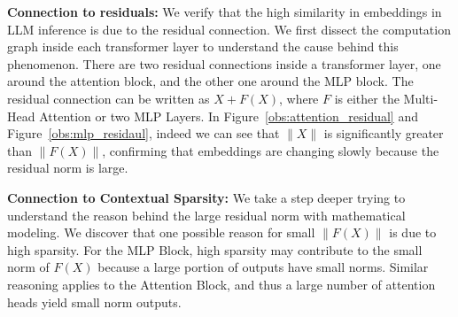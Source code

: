 \textbf{Connection to residuals:} We verify that the high similarity in embeddings in LLM inference is due to the residual connection. We first dissect the computation graph inside each transformer layer to understand the cause behind this phenomenon. There are two residual connections inside a transformer layer, one around the attention block, and the other one around the MLP block. The residual connection can be written as $X + F(X)$, where $F$ is either the Multi-Head Attention or two MLP Layers.  In Figure~\ref{obs:attention_residual} and Figure~\ref{obs:mlp_residaul},  indeed we can see that $\|X\|$ is significantly greater than $\|F(X)\|$, confirming that embeddings are changing slowly because the residual norm is large.   

\textbf{Connection to Contextual Sparsity:} We take a step deeper trying to understand the reason behind the large residual norm with mathematical modeling.  
We discover that one possible reason for small $\|F(X)\|$ is due to high sparsity. For the MLP Block, high sparsity may contribute to the small norm of $F(X)$ because a large portion of outputs have small norms. Similar reasoning applies to the Attention Block, and thus a large number of attention heads yield small norm outputs.











